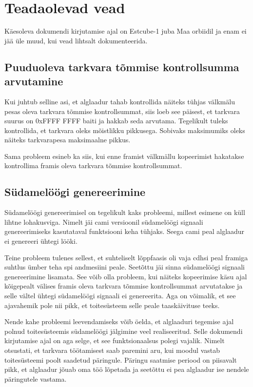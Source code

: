 \documentclass[12pt,a4paper]{article}
\begin{document}
\section{Teadaolevad vead}
Käesoleva dokumendi kirjutamise ajal on Estcube-1 juba Maa orbiidil ja enam ei
jää üle muud, kui vead lihtsalt dokumenteerida.
\subsection{Puuduoleva tarkvara tõmmise kontrollsumma arvutamine}
Kui juhtub selline asi, et alglaadur tahab kontrollida näiteks tühjas välkmälu
pesas oleva tarkvara tõmmise kontrollsummat, siis loeb see päisest, et tarkvara
suurus on 0xFFFF FFFF baiti ja hakkab seda arvutama. Tegelikult tuleks
kontrollida, et tarkvara oleks mõistlikku pikkusega. Sobivaks maksimumiks oleks
näiteks tarkvarapesa maksimaalne pikkus.

Sama probleem esineb ka siis, kui enne \gls{fram}ist välkmällu kopeerimist hakatakse
kontrollima \gls{fram}is oleva tarkvara tõmmise kontrollsummat.

\subsection{Südamelöögi genereerimine}
Südamelöögi genereerimisel on tegelikult kaks probleemi, millest esimene on küll
lihtne lohakusviga. Nimelt jäi \gls{cam}i versioonil südamelöögi signaali
genereerimiseks kasutataval funktsiooni keha tühjaks. Seega \gls{cam}i peal
alglaadur ei genereeri ühtegi lööki.

Teine probleem tulenes sellest, et suhteliselt lõppfaasis oli vaja \gls{cdhs}i
peal \gls{fram}iga suhtlus ümber teha \gls{spi} andmesiini peale. Seetõttu jäi
sinna südamelöögi signaali genereerimine lisamata. See võib olla probleem, kui
näiteks kopeerimise käsu ajal kõigepealt välises \gls{fram}is oleva tarkvara
tõmmise kontrollsummat arvutatakse ja selle vältel ühtegi südamelöögi signaali
ei genereerita. Aga on võimalik, et see ajavahemik pole nii pikk, et
toitesüsteem selle peale taaskäivituse teeks.

Nende kahe probleemi leevendamiseks võib öelda, et alglaaduri tegemise ajal
polnud toitesüsteemis südamelöögi jälgimine veel realiseeritud. Selle dokumendi
kirjutamise ajal on aga selge, et see funktsionaalsus polegi vajalik. Nimelt
otsustati, et tarkvara töötamisest saab paremini aru, kui moodul vastab
toitesüsteemi poolt saadetud päringule. Päringu saatmise periood on piisavalt
pikk, et alglaadur jõuab oma töö lõpetada ja seetõttu ei pea alglaadur ise
nendele päringutele vastama.
\end{document}
